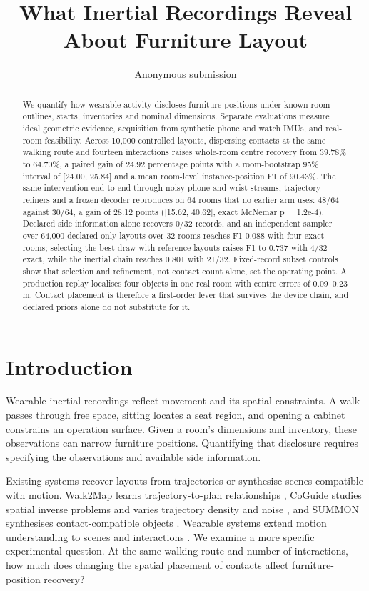 \documentclass[10pt,twocolumn,letterpaper]{article}
\title{What Inertial Recordings Reveal About Furniture Layout}
\author{Anonymous submission}
\begin{document}
\maketitle
\begin{abstract}
We quantify how wearable activity discloses furniture positions under
known room outlines, starts, inventories and nominal dimensions.
Separate evaluations measure ideal geometric evidence, acquisition from
synthetic phone and watch IMUs, and real-room feasibility. Across 10,000
controlled layouts, dispersing contacts at the same walking route and
fourteen interactions raises whole-room centre recovery from 39.78\% to
64.70\%, a paired gain of 24.92 percentage points with a room-bootstrap
95\% interval of {[}24.00, 25.84{]} and a mean room-level
instance-position F1 of 90.43\%. The same intervention end-to-end through
noisy phone and wrist streams, trajectory refiners and a frozen decoder
reproduces on 64 rooms that no earlier arm uses: 48/64 against 30/64, a
gain of 28.12 points ({[}15.62, 40.62{]}, exact McNemar p = 1.2e-4).
Declared side information alone recovers 0/32 records, and an
independent sampler over 64,000 declared-only layouts over 32 rooms
reaches F1 0.088 with four exact rooms; selecting the best draw with
reference layouts raises F1 to 0.737 with 4/32 exact, while the inertial
chain reaches 0.801 with 21/32. Fixed-record subset controls show that
selection and refinement, not contact count alone, set the operating
point. A production replay localises four objects in one real room with
centre errors of 0.09--0.23 m. Contact placement is therefore a
first-order lever that survives the device chain, and declared priors
alone do not substitute for it.
\end{abstract}
\section{Introduction}\label{introduction}

Wearable inertial recordings reflect movement and its spatial
constraints. A walk passes through free space, sitting locates a seat
region, and opening a cabinet constrains an operation surface. Given a
room's dimensions and inventory, these observations can narrow furniture
positions. Quantifying that disclosure requires specifying the
observations and available side information.

Existing systems recover layouts from trajectories or synthesise scenes
compatible with motion. Walk2Map learns trajectory-to-plan relationships
\cite{r1}, CoGuide studies spatial inverse problems and varies
trajectory density and noise \cite{r2}, and SUMMON synthesises
contact-compatible objects \cite{r3}. Wearable systems extend motion
understanding to scenes and interactions \cite{r4,r12}. We examine a
more specific experimental question. At the same walking route and
number of interactions, how much does changing the spatial placement of
contacts affect furniture-position recovery?
\end{document}
